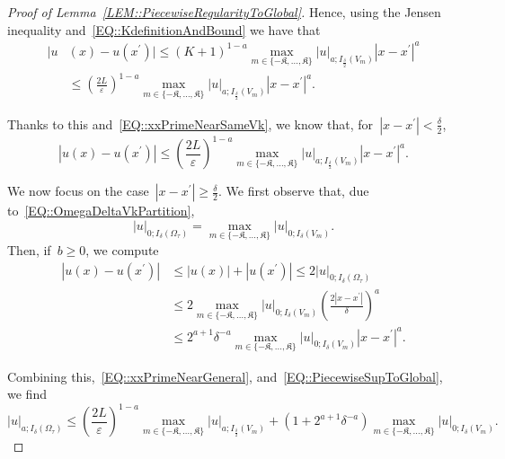 \documentclass[12pt,a4paper]{amsart}
\numberwithin{equation}{section}
\theoremstyle{definition}
\theoremstyle{remark}
\newcommand{\eps}{\varepsilon}
\newcommand{\abs}[1]{\left\lvert#1\right\rvert}
\renewcommand{\leq}{\leqslant}
\renewcommand{\geq}{\geqslant}
\begin{document}
\begin{appendix}
\begin{proof}[Proof of Lemma~\ref{LEM::PiecewiseRegularityToGlobal}]
    Hence, using the Jensen inequality and~\eqref{EQ::KdefinitionAndBound} we have that
    \begin{equation}
        \begin{split}
            |u&(x)-u(x^\prime)| \leq {(K+1)}^{1-a} \max_{m \in \{-\mathfrak{K},\dots,\mathfrak{K}\}} \abs{u}_{a; I_{\frac{\delta}{2}}(V_m)}\abs{x-x^\prime}^a\\
                &\leq {\left(\frac{2L}{\eps}\right)}^{1-a} \max_{m \in \{-\mathfrak{K},\dots,\mathfrak{K}\}} \abs{u}_{a; I_{\frac{\delta}{2}}(V_m)}\abs{x-x^\prime}^a.
        \end{split}
    \end{equation}

    Thanks to this and~\eqref{EQ::xxPrimeNearSameVk}, we know that, for~$\abs{x-x^\prime} < \frac{\delta}{2}$,
    \begin{equation}\label{EQ::xxPrimeNearGeneral}
        \abs{u(x)-u(x^\prime)} \leq {\left(\frac{2L}{\eps}\right)}^{1-a}\max_{m \in \{-\mathfrak{K},\dots,\mathfrak{K}\}} \abs{u}_{a; I_{\frac{\delta}{2}}(V_m)}\abs{x-x^\prime}^a.
    \end{equation}

    We now focus on the case~$\abs{x-x^\prime} \geq \frac{\delta}{2}$. We first observe that, due to~\eqref{EQ::OmegaDeltaVkPartition},
    \begin{equation}\label{EQ::PiecewiseSupToGlobal}
        \abs{u}_{0;I_\delta(\Omega_\tau)} = \max_{m \in \{-\mathfrak{K},\dots,\mathfrak{K}\}}\abs{u}_{0;I_\delta(V_m)}.
    \end{equation}
    Then, if~$b \geq 0$, we compute
    \begin{align}\label{EQ::xxprimeFarPositiveB}
        \abs{u(x)-u(x^\prime)} &\leq \abs{u(x)}+\abs{u(x^\prime)} \leq 2\abs{u}_{0;I_\delta(\Omega_\tau)}\\
            &\leq 2\max_{m \in \{-\mathfrak{K},\dots,\mathfrak{K}\}}\abs{u}_{0;I_\delta(V_m)}{\left(\frac{2\abs{x-x^\prime}}{\delta}\right)}^a\\
            &\leq 2^{a+1}{\delta^{-a}}\max_{m \in \{-\mathfrak{K},\dots,\mathfrak{K}\}}\abs{u}_{0;I_\delta(V_m)}\abs{x-x^\prime}^a.
    \end{align}

    Combining this,~\eqref{EQ::xxPrimeNearGeneral}, and~\eqref{EQ::PiecewiseSupToGlobal}, we find
    \begin{equation}\label{EQ::PiecewiseToGlobalDelta}
        \abs{u}_{a; I_\delta(\Omega_\tau)} \leq {\left(\frac{2L}{\eps}\right)}^{1-a}\max_{m \in \{-\mathfrak{K},\dots,\mathfrak{K}\}} \abs{u}_{a; I_{\frac{\delta}{2}}(V_m)} + (1+2^{a+1}{\delta^{-a}})\max_{m \in \{-\mathfrak{K},\dots,\mathfrak{K}\}}\abs{u}_{0;I_\delta(V_m)}.
    \end{equation}


\end{proof}
\end{appendix}
\end{document}
